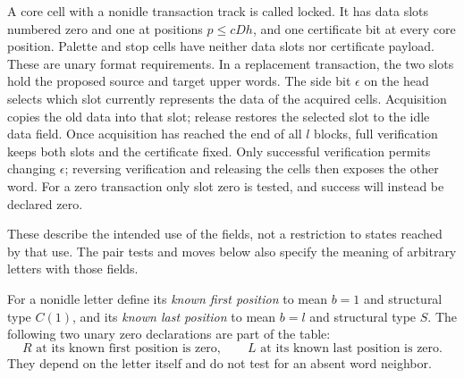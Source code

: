 A core cell with a nonidle transaction track is called locked. It has
data slots numbered zero and one at positions $p\leq cDh$, and one
certificate bit at every core position. Palette and stop cells have
neither data slots nor certificate payload. These are unary format
requirements. In a replacement transaction, the two slots hold the
proposed source and target upper words. The side bit $\epsilon$ on the
head selects which slot currently represents the data of the acquired
cells. Acquisition copies the old data into that slot; release restores
the selected slot to the idle data field. Once acquisition has reached
the end of all $l$ blocks, full verification keeps both slots and the
certificate fixed. Only successful verification permits changing
$\epsilon$; reversing verification and releasing the cells then exposes
the other word. For a zero transaction only slot zero is tested, and
success will instead be declared zero.

These describe the intended use of the fields, not a restriction to
states reached by that use. The pair tests and moves below also specify
the meaning of arbitrary letters with those fields.

For a nonidle letter define its \emph{known first position} to mean
$b=1$ and structural type $C(1)$, and its \emph{known last position}
to mean $b=l$ and structural type $S$.  The following two unary zero
declarations are part of the table:
\begin{equation}\label{fr:endpoint-zero}
 R\text{ at its known first position is zero},\qquad
 L\text{ at its known last position is zero}.
\end{equation}
They depend on the letter itself and do not test for an absent word
neighbor.


